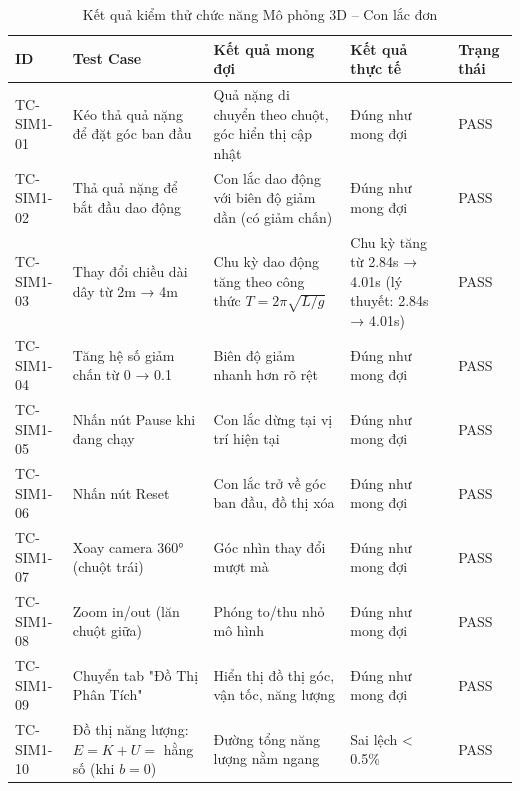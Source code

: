 \begin{table}[H]
\centering
\caption{Kết quả kiểm thử chức năng Mô phỏng 3D – Con lắc đơn}
\begin{tabular}{|p{}|p{}|p{}|p{}|p{}|}
\hline
\textbf{ID} & \textbf{Test Case} & \textbf{Kết quả mong đợi} & \textbf{Kết quả thực tế} & \textbf{Trạng thái} \\
\hline
TC-SIM1-01 & Kéo thả quả nặng để đặt góc ban đầu & Quả nặng di chuyển theo chuột, góc hiển thị cập nhật & Đúng như mong đợi & PASS \\
\hline
TC-SIM1-02 & Thả quả nặng để bắt đầu dao động & Con lắc dao động với biên độ giảm dần (có giảm chấn) & Đúng như mong đợi & PASS \\
\hline
TC-SIM1-03 & Thay đổi chiều dài dây từ 2m → 4m & Chu kỳ dao động tăng theo công thức $T = 2\pi\sqrt{L/g}$ & Chu kỳ tăng từ 2.84s → 4.01s (lý thuyết: 2.84s → 4.01s) & PASS \\
\hline
TC-SIM1-04 & Tăng hệ số giảm chấn từ 0 → 0.1 & Biên độ giảm nhanh hơn rõ rệt & Đúng như mong đợi & PASS \\
\hline
TC-SIM1-05 & Nhấn nút Pause khi đang chạy & Con lắc dừng tại vị trí hiện tại & Đúng như mong đợi & PASS \\
\hline
TC-SIM1-06 & Nhấn nút Reset & Con lắc trở về góc ban đầu, đồ thị xóa & Đúng như mong đợi & PASS \\
\hline
TC-SIM1-07 & Xoay camera 360° (chuột trái) & Góc nhìn thay đổi mượt mà & Đúng như mong đợi & PASS \\
\hline
TC-SIM1-08 & Zoom in/out (lăn chuột giữa) & Phóng to/thu nhỏ mô hình & Đúng như mong đợi & PASS \\
\hline
TC-SIM1-09 & Chuyển tab "Đồ Thị Phân Tích" & Hiển thị đồ thị góc, vận tốc, năng lượng & Đúng như mong đợi & PASS \\
\hline
TC-SIM1-10 & Đồ thị năng lượng: $E = K + U =$ hằng số (khi $b=0$) & Đường tổng năng lượng nằm ngang & Sai lệch < 0.5\% & PASS \\
\hline
\end{tabular}
\end{table}

